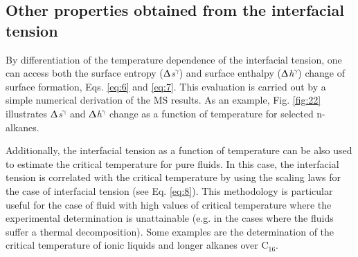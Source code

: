 \documentclass[9pt,bestpractices]{livecoms}
\begin{document}
\subsection{Other properties obtained from the interfacial tension}

By differentiation of the temperature dependence of the interfacial tension,
one can access both  the surface entropy (${\Updelta}$\textit{s}$^{{\gamma}}$)
and surface enthalpy (${\Updelta}$\textit{h}$^{{\gamma}}$) change of surface
formation, Eqs. \ref{eq:6} and \ref{eq:7}. This evaluation is carried out by a simple
numerical derivation of the MS results. As an example, Fig. \ref{fig:22} illustrates
${\Updelta}$\textit{s}$^{\mathrm{{\gamma}}}$ and
${\Updelta}$\textit{h}$^{\mathrm{{\gamma}}}$ change as a function of
temperature for selected n-alkanes.

Additionally, the interfacial tension as a function of temperature can be also
used to estimate the critical temperature for pure fluids. In this case, the
interfacial tension is correlated with the critical temperature by using the
scaling laws for the case of interfacial tension (see Eq. \ref{eq:8}).
This methodology is particular useful for the case of fluid with high values of
critical temperature where the experimental determination is unattainable 
(e.g. in the cases where the fluids suffer a thermal decomposition). Some examples
are the determination of the critical temperature of ionic liquids and
longer alkanes over C$_{16}$.
\end{document}
